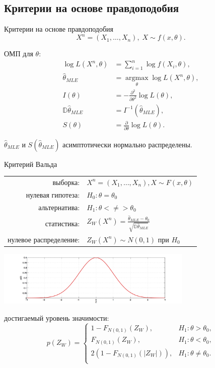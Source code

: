 \documentclass[9pt,pdf,utf8,hyperref={unicode},aspectratio=169]{beamer}
\def\argmax#1{ \mathop{\text{argmax}}\limits_{#1} }
\begin{document}
\subsection{Критерии на основе правдоподобия}
\begin{frame}{Критерии на основе правдоподобия}	
	$$X^{n} = \left( X_{1}, \ldots, X_{n} \right), \; X \sim f\left(x, \theta\right).$$
	
	ОМП для $\theta$:
	\begin{align*}
	\log L\left(X^n,\theta\right) &= \sum\limits_{i=1}^n \log f\left(X_i, \theta\right), \\
	\hat{\theta}_{MLE}&= \argmax{\theta} \log L\left( X^n, \theta \right), \\
	I\left(\theta\right) &=   - \frac{\partial^2}{\partial\theta^2}\log L\left(\theta\right), \\
	\mathbb D\hat{\theta}_{MLE} &= I^{-1}\left(\hat{\theta}_{MLE}\right), \\
	S\left(\theta\right) &= \frac{\partial}{\partial \theta} \log L\left( \theta\right).
	\end{align*}
	
	$\hat{\theta}_{MLE}$ и $S\left(\hat{\theta}_{MLE}\right)$ асимптотически нормально распределены.
\end{frame}

\begin{frame}{Критерий Вальда}
	\begin{center}
		\begin{tabular}{rl}
			выборка:                        & $X^n=\left(X_1,\ldots,X_n\right), X\sim F\left(x, \theta\right)$\\
			нулевая гипотеза:               & $H_0\colon \theta=\theta_0$ \\
			альтернатива:                   & $H_1\colon \theta<\neq>\theta_0$ \\
			статистика:                     & $Z_W\left(X^n\right) = \frac{\hat{\theta}_{MLE} - \theta_0}{\sqrt{\mathbb D \hat{\theta}_{MLE}}}$ \\
			нулевое распределение:          & $Z_W\left(X^n\right) \sim N\left(0,1\right)$ при $H_0$\\
		\end{tabular}
		\includegraphics[width=0.7\textwidth]{norm.png}
	\end{center}
	достигаемый уровень значимости:
	$$p\left(Z_W\right) = \begin{cases}
	1-F_{N(0,1)}(Z_W), & H_1 \colon \theta>\theta_0, \\
	F_{N(0,1)}(Z_W), & H_1 \colon \theta<\theta_0, \\
	2\left(1-F_{N(0,1)}(|Z_W|)\right), & H_1 \colon \theta\neq\theta_0. \\
	\end{cases}
	$$
\end{frame}
\end{document}
